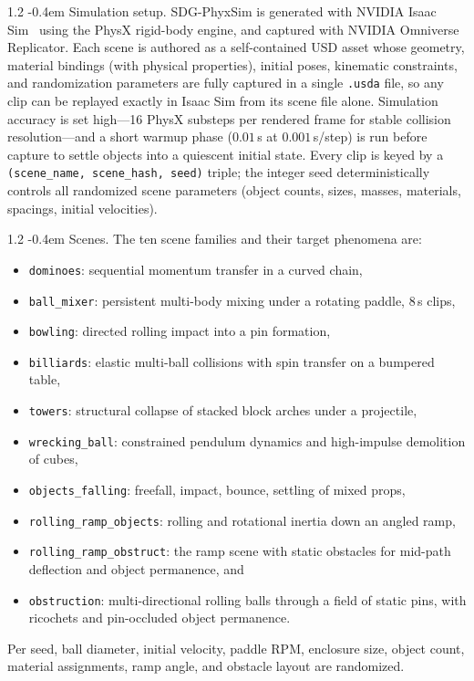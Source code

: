 \documentclass{llmxive}
\makeatletter
\providecommand{\paragraph}{  \@startsection{paragraph}{4}{\z@}    {1\baselineskip \@plus .2\baselineskip}    {-0.4em}    {\normalfont\normalsize\bfseries}}
\makeatother
\begin{document}
\paragraph{Simulation setup.}
\label{appendix:sdg_phyxsim_simulation_setup}
SDG-PhyxSim is generated with NVIDIA Isaac Sim~\citep{nvidia_isaac_sim_2026} using the PhysX rigid-body
engine, and captured with NVIDIA Omniverse
Replicator. Each scene is authored as a self-contained USD asset whose
geometry, material bindings (with physical properties), initial poses,
kinematic constraints, and randomization parameters are fully captured in a
single \texttt{.usda} file, so any clip can be replayed exactly in Isaac Sim
from its scene file alone. Simulation accuracy is set high---16 PhysX
substeps per rendered frame for stable collision resolution---and a short
warmup phase ($0.01$\,s at $0.001$\,s/step) is run before capture to settle
objects into a quiescent initial state. Every clip is keyed by a
\texttt{(scene\_name, scene\_hash, seed)} triple; the integer seed
deterministically controls all randomized scene parameters (object counts,
sizes, masses, materials, spacings, initial velocities).

\paragraph{Scenes.}
\label{appendix:sdg_phyxsim_scenes}
The ten scene families and their target phenomena are:
\begin{itemize}
    \item \texttt{dominoes}: sequential momentum transfer in a curved chain,
    \item \texttt{ball\_mixer}: persistent multi-body mixing under a rotating paddle, $8$\,s clips,
    \item \texttt{bowling}: directed rolling impact into a pin formation,
    \item \texttt{billiards}: elastic multi-ball collisions with spin transfer on a bumpered table,
    \item \texttt{towers}: structural collapse of stacked block arches under a projectile,
    \item \texttt{wrecking\_ball}: constrained pendulum dynamics and high-impulse demolition of cubes,
    \item \texttt{objects\_falling}: freefall, impact, bounce, settling of mixed props,
    \item \texttt{rolling\_ramp\_objects}: rolling and rotational inertia down an angled ramp,
    \item \texttt{rolling\_ramp\_obstruct}: the ramp scene with static obstacles for mid-path deflection and object permanence,
    and
    \item \texttt{obstruction}: multi-directional rolling balls through a field of static pins, with ricochets and pin-occluded object permanence.
\end{itemize}
Per seed, ball diameter, initial velocity, paddle RPM, enclosure size, object count, material assignments, ramp angle, and obstacle layout are randomized.
\end{document}
